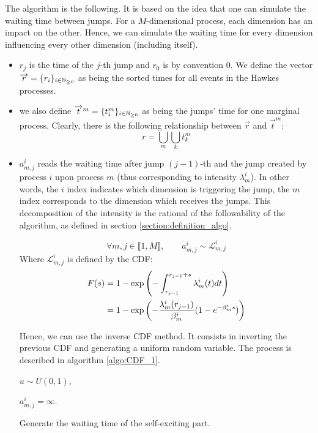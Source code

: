 \documentclass[11pt]{book}
\newcommand{\sequence}[1]{\{ #1 \}_{ i \in \N} }
\begin{document}
The algorithm is the following. It is based on the idea that one can simulate the waiting time between jumps. For a $M$-dimensional process, each dimension has an impact on the other. Hence, we can simulate the waiting time for every dimension influencing every other dimension (including itself).




\begin{itemize}
\item $r_j$ is the time of the $j$-th jump and $r_0$ is by convention $0$. We define the vector $\overrightarrow{r} = \sequence{r_i}$ as being the sorted times for all events in the Hawkes processes. 
\item we also define $\overrightarrow{t}^m = \sequence{ t_i^m } $ as being the jumps' time for one marginal process. Clearly, there is the following relationship between $\overrightarrow{r}$ and $\overrightarrow{t}^m $:
$$ r = \bigcup_m \bigcup_k  t_k^m $$
\item $a_{m,j}^i$ reads the waiting time after jump $(j-1)$-th and the jump created by process $i$ upon process $m$ (thus corresponding to intensity $ \lambda^i_m$). In other words, the $i$ index indicates which dimension is triggering the jump, the $m$ index corresponds to the dimension which receives the jumps. This decomposition of the intensity is the rational of the followability of the algorithm, as defined in section \ref{section:definition_algo}.


\begin{remarque}
$$\forall m,j \in  \llbracket 1, M \rrbracket, \qquad a_{m,j}^i \sim \mathcal L_{m,j}^i   $$
Where $\mathcal L_{m,j}^i $ is defined by the CDF:
\begin{align}
F(s) &= 1 - \exp \left ( - \int_{r_{j-1}}^{r_{j-1} + s } \lambda_m^i (t) dt \right ) \notag \\
&= 1 - \exp \left ( - \frac { \lambda^i_m ( r_{j-1} ) } { \beta_m^i } ( 1 - e^{ - \beta_m^i s} ) \right )
\label{eq:L_defined}
\end{align}

Hence, we can use the inverse CDF method. It consists in inverting the previous CDF and generating a uniform random variable. The process is described in algorithm \ref{algo:CDF_1}.
\end{remarque}



\begin{algorithm}[H]
\label{algo:CDF_1}
\SetAlgoLined
$u \sim U(0,1)$,

{$ a ^i_{m,j} = \infty $.}
\caption{Generate the waiting time of the self-exciting part.}
\end{algorithm}



\end{itemize}
\end{document}
